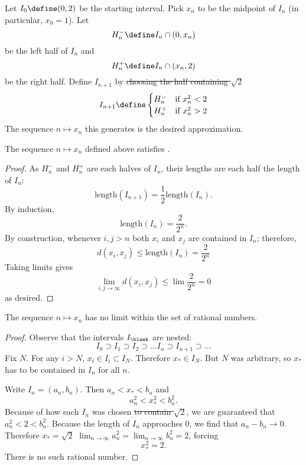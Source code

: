 \documentclass{scrartcl}
\newcommand{\dist}{d}
\begin{document}
\begin{defn}

  Let \(I_{0}\define(0,2)\) be the starting interval. Pick \(x_{n}\) to be the midpoint of \(I_{n}\) (in particular, \(x_{0}=1\)). Let \[H_{n}^{-}\define I_{n}\cap (0,x_{n})\] be the left half of \(I_{n}\) and
  \[H_{n}^{+}\define I_{n}\cap (x_{n},2)\] be the right half.
  Define \(I_{{n+1}}\) by \sout{choosing the half containing \(\sqrt 2\)}
  \[
    I_{{n+1}} \define
    \begin{cases}
      H_{n}^{-}& \textrm{if } x_{n}^{2} < 2 \\
      H_{n}^{+}& \textrm{if } x_{n}^{2} > 2
    \end{cases}
  \]
  The sequence \(n \mapsto x_{n}\) this generates is the desired approximation.
\end{defn}
\begin{theorem}
  The sequence \(n\mapsto x_{n}\) defined above satisfies .
\end{theorem}
\begin{proof}
  As \(H_{n}^{-}\) and \(H_{n}^{+}\) are each halves of \(I_{n}\), their lengths are each half the length of \(I_{n}\):
  \[
    \textrm{length}(I_{n+1}) = \frac 1 2 \textrm{length}(I_{n}).
  \]
  By induction, \[
    \textrm{length}(I_{n}) = \frac{2}{2^{n}}.
  \]
  By construction, whenever \(i,j > n\) both \(x_{i}\) and \(x_{j}\) are contained in \(I_{n}\); therefore,
  \[
    \dist(x_{i},x_{j}) \leq \textrm{length}(I_{n}) = \frac{2}{2^{n}}
  \]
  Taking limits gives
  \[
    \lim_{{i,j}\to\infty} \dist(x_{i},x_{j}) \leq \lim \frac{2}{2^{n}} = 0
  \]
  as desired.
\end{proof}

\begin{theorem}
  The sequence \(n\mapsto x_{n}\) has no limit within the set of rational numbers.
\end{theorem}
\begin{proof}
  Observe that the intervals \(I_{\blank}\) are nested:
  \[
    I_{0} \supset I_{1} \supset I_{2} \supset \dots I_{n} \supset I_{n+1} \supset \dots
  \]
  Fix \(N\). For any \(i> N\), \(x_{i}\in I_{i} \subset I_{N}\). Therefore \(x_{*}\in I_{N}\). But \(N\) was arbitrary, so \(x_{*}\) has to be contained in \(I_{n}\) for all \(n\).

  Write \(I_{n} = (a_{n},b_{n})\). Then \(a_{n}< x_{*} < b_{n}\) and
  \[a_{n}^{2} < x_{*}^{2} < b_{n}^{2}.\]
  Because of how each \(I_{n}\) was chosen \sout{to contain \(\sqrt 2\)}, we are guaranteed that \(a_{n}^{2}< 2 < b_{n}^{2}\). Because the length of \(I_{n}\) approaches \(0\), we find that \(a_{n}-b_{n}\to 0\). Therefore \sout{\(x_{*}=\sqrt 2\)} \(\lim_{{n\to\infty}} a_{n}^{2}=\lim_{{n\to\infty}}b_{n}^{2} = 2\), forcing
  \[
    x_{*}^{2} = 2.
  \]
  There is no such rational number.
\end{proof}
\end{document}
